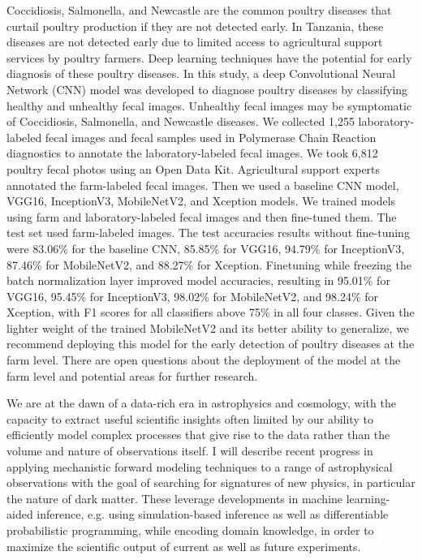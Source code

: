 Coccidiosis, Salmonella, and Newcastle are the common poultry diseases that curtail poultry production if they are not detected early. In Tanzania, these diseases are not detected early due to limited access to agricultural support services by poultry farmers. Deep learning techniques have the potential for early diagnosis of these poultry diseases. In this study, a deep Convolutional Neural Network (CNN) model was developed to diagnose poultry diseases by classifying healthy and unhealthy fecal images. Unhealthy fecal images may be symptomatic of Coccidiosis, Salmonella, and Newcastle diseases. We collected 1,255 laboratory-labeled fecal images and fecal samples used in Polymerase Chain Reaction diagnostics to annotate the laboratory-labeled fecal images. We took 6,812 poultry fecal photos using an Open Data Kit. Agricultural support experts annotated the farm-labeled fecal images. Then we used a baseline CNN model, VGG16, InceptionV3, MobileNetV2, and Xception models. We trained models using farm and laboratory-labeled fecal images and then fine-tuned them. The test set used farm-labeled images. The test accuracies results without fine-tuning were 83.06\% for the baseline CNN, 85.85\% for VGG16, 94.79\% for InceptionV3, 87.46\% for MobileNetV2, and 88.27\% for Xception. Finetuning while freezing the batch normalization layer improved model accuracies, resulting in 95.01\% for VGG16, 95.45\% for InceptionV3, 98.02\% for MobileNetV2, and 98.24\% for Xception, with F1 scores for all classifiers above 75\% in all four classes. Given the lighter weight of the trained MobileNetV2 and its better ability to generalize, we recommend deploying this model for the early detection of poultry diseases at the farm level. There are open questions about the deployment of the model at the farm level and potential areas for further research.

\license

We are at the dawn of a data-rich era in astrophysics and cosmology, with the capacity to extract useful scientific insights often limited by our ability to efficiently model complex processes that give rise to the data rather than the volume and nature of observations itself. I will describe recent progress in applying mechanistic forward modeling techniques to a range of astrophysical observations with the goal of searching for signatures of new physics, in particular the nature of dark matter. These leverage developments in machine learning-aided inference, e.g. using simulation-based inference as well as differentiable probabilistic programming, while encoding domain knowledge, in order to maximize the scientific output of current as well as future experiments.

